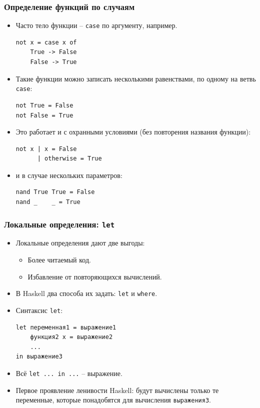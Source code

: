 \documentclass[11pt]{beamer}
\begin{document}
\begin{frame}[fragile]
\frametitle{Определение функций по случаям}
\begin{itemize}
    \item Часто тело функции -- \lstinline|case| по аргументу, например.
\begin{lstlisting}[basicstyle=\ttfamily\scriptsize]
not x = case x of
    True -> False
    False -> True
\end{lstlisting}
\item Такие функции можно записать несколькими равенствами, по одному на ветвь \lstinline|case|:
\begin{lstlisting}[basicstyle=\ttfamily\scriptsize]
not True = False
not False = True
\end{lstlisting}
\item Это работает и с охранными условиями (без повторения названия функции):
\begin{lstlisting}[basicstyle=\ttfamily\scriptsize]
not x | x = False
      | otherwise = True
\end{lstlisting}
\item и в случае нескольких параметров:
\begin{lstlisting}[basicstyle=\ttfamily\scriptsize]
nand True True = False
nand _    _ = True
\end{lstlisting}
\end{itemize}
\end{frame}

\begin{frame}[fragile]
\frametitle{Локальные определения: \lstinline[basicstyle=\ttfamily]|let|}
\begin{itemize}
    \item Локальные определения дают две выгоды:
    \begin{itemize}
        \item Более читаемый код.
        \item Избавление от повторяющихся вычислений.
    \end{itemize}
    \item В Haskell два способа их задать: \lstinline|let| и \lstinline|where|.
    \item Синтаксис \lstinline|let|:
\begin{lstlisting}
let переменная1 = выражение1
    функция2 x = выражение2
    ...
in выражение3
\end{lstlisting}
    \item Всё \lstinline|let ... in ...| -- выражение.
    \item Первое проявление ленивости Haskell: будут вычислены только те переменные, которые понадобятся для вычисления \lstinline|выражения3|.
\end{itemize}
\end{frame}
\end{document}
